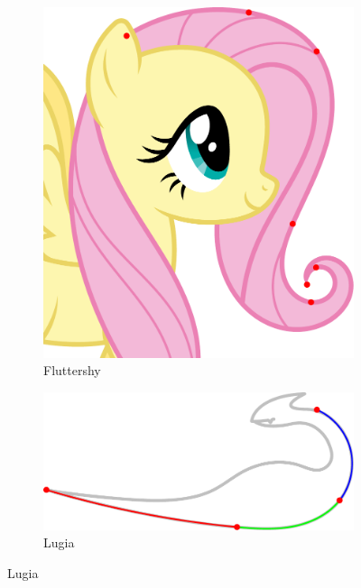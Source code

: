 \documentclass[a4paper]{article}
\begin{document}
				\begin{figure}[htb]
					\centering
					\begin{subfigure}[b]{\textwidth / 2}
						\includegraphics[width=\textwidth]{content/output/examples_spiro_fluttershy.pdf}
						\caption{Fluttershy \cite{fluttershy}}
						\label{figure:examples_spiro_fluttershy}
					\end{subfigure}%
					\begin{minipage}[b]{\textwidth / 2}
						\begin{subfigure}[b]{\textwidth}
							\includegraphics[width=\textwidth]{content/output/examples_spiro_lugia_1.pdf}
							\caption{Lugia \cite{lugia}}

\end{subfigure}
\end{minipage}
\end{figure}
\end{document}

